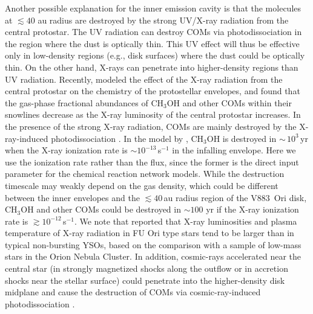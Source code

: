 \documentclass[linenumbers, twocolumn, twocolappendix, astrosymb, times]{aastex631}
\newcommand{\methanol}{CH$_3$OH\xspace}
\begin{document}
Another possible explanation for the inner emission cavity is that the molecules at $\lesssim40$ au radius are destroyed by the strong UV/X-ray radiation from the central protostar. The UV radiation can destroy COMs via photodissociation \citep[e.g.,][]{Garrod2006, Oberg2009} in the region where the dust is optically thin. This UV effect will thus be effective only in low-density regions (e.g., disk surfaces) where the dust could be optically thin.
On the other hand, X-rays can penetrate into higher-density regions than UV radiation.
Recently, \citet{Notsu2021} modeled the effect of the X-ray radiation from the central protostar on the chemistry of the protostellar envelopes, and found that the gas-phase fractional abundances of \methanol and other COMs within their snowlines decrease as the X-ray luminosity of the central protostar increases. In the presence of the strong X-ray radiation, COMs are mainly destroyed by the X-ray-induced photodissociation \citep[e.g.,][]{Garrod2006, Taquet2016, Notsu2021}. 
In the model by \citet{Notsu2021}, \methanol is destroyed in $\sim\,10^3$\,yr when the X-ray ionization rate is $\sim10^{-13}$\,s$^{-1}$ in the infalling envelope. Here we use the ionization rate rather than the flux, since the former is the direct input parameter for the chemical reaction network models. While the destruction timescale may weakly depend on the gas density, which could be different between the inner envelopes and the $\lesssim40$\,au radius region of the V883~Ori disk, \methanol and other COMs could be destroyed in $\sim100$ yr if the X-ray ionization rate is $\gtrsim 10^{-12}$\,s$^{-1}$.
We note that \citet{Kuhn2019} reported that X-ray luminosities and plasma temperature of X-ray radiation in FU Ori type stars tend to be larger than in typical non-bursting YSOs, based on the comparison with a sample of low-mass stars in the Orion Nebula Cluster.
In addition, cosmic-rays accelerated near the central star (in strongly magnetized shocks along the outflow or in accretion shocks near the stellar surface) could penetrate into the higher-density disk midplane and cause the destruction of COMs via cosmic-ray-induced photodissociation \citep[e.g.,][]{Padovani2020, Cabedo2023}.
\end{document}
